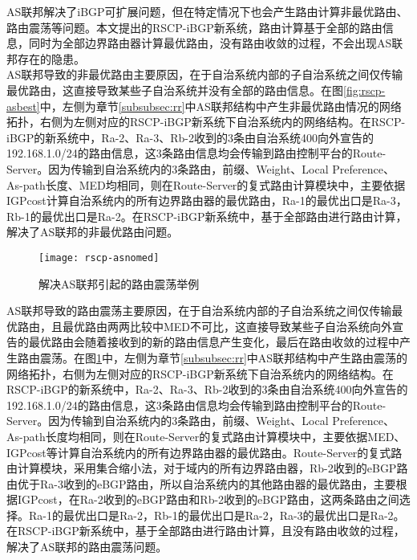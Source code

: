 AS联邦解决了iBGP可扩展问题，但在特定情况下也会产生路由计算非最优路由、路由震荡等问题。本文提出的RSCP-iBGP新系统，路由计算基于全部的路由信息，同时为全部边界路由器计算最优路由，没有路由收敛的过程，不会出现AS联邦存在的隐患。\\

AS联邦导致的非最优路由主要原因，在于自治系统内部的子自治系统之间仅传输最优路由，这直接导致某些子自治系统并没有全部的路由信息。在图\ref{fig:rscp-asbest}中，左侧为章节\ref{subsubsec:rr}中AS联邦结构中产生非最优路由情况的网络拓扑，右侧为左侧对应的RSCP-iBGP新系统下自治系统内的网络结构。在RSCP-iBGP的新系统中，Ra-2、Ra-3、Rb-2收到的3条由自治系统400向外宣告的192.168.1.0/24的路由信息，这3条路由信息均会传输到路由控制平台的Route-Server。因为传输到自治系统内的3条路由，前缀、Weight、Local Preference、As-path长度、MED均相同，则在Route-Server的复式路由计算模块中，主要依据IGPcost计算自治系统内的所有边界路由器的最优路由，Ra-1的最优出口是Ra-3，Rb-1的最优出口是Ra-2。在RSCP-iBGP新系统中，基于全部路由进行路由计算，解决了AS联邦的非最优路由问题。\\




\begin{figure}
  \centering
  \texttt{[image: rscp-asnomed]}
  \caption{解决AS联邦引起的路由震荡举例}
  \label{fig:rscp-asnomed}
\end{figure}


AS联邦导致的路由震荡主要原因，在于自治系统内部的子自治系统之间仅传输最优路由，且最优路由两两比较中MED不可比，这直接导致某些子自治系统向外宣告的最优路由会随着接收到的新的路由信息产生变化，最后在路由收敛的过程中产生路由震荡。在图\ref{fig:rscp-asnomed}中，左侧为章节\ref{subsubsec:rr}中AS联邦结构中产生路由震荡的网络拓扑，右侧为左侧对应的RSCP-iBGP新系统下自治系统内的网络结构。在RSCP-iBGP的新系统中，Ra-2、Ra-3、Rb-2收到的3条由自治系统400向外宣告的192.168.1.0/24的路由信息，这3条路由信息均会传输到路由控制平台的Route-Server。因为传输到自治系统内的3条路由，前缀、Weight、Local Preference、As-path长度均相同，则在Route-Server的复式路由计算模块中，主要依据MED、IGPcost等计算自治系统内的所有边界路由器的最优路由。Route-Server的复式路由计算模块，采用集合缩小法，对于域内的所有边界路由器，Rb-2收到的eBGP路由优于Ra-3收到的eBGP路由，所以自治系统内的其他路由器的最优路由，主要根据IGPcost，在Ra-2收到的eBGP路由和Rb-2收到的eBGP路由，这两条路由之间选择。Ra-1的最优出口是Ra-2，Rb-1的最优出口是Ra-2，Ra-3的最优出口是Ra-2。在RSCP-iBGP新系统中，基于全部路由进行路由计算，且没有路由收敛的过程，解决了AS联邦的路由震荡问题。

